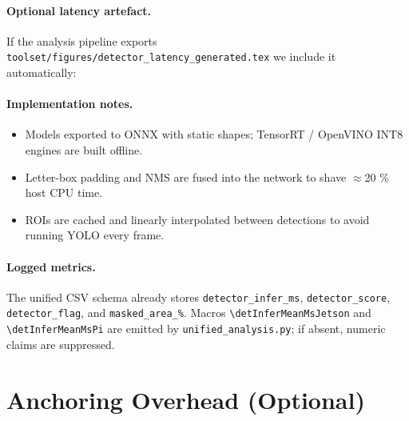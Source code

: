 \paragraph{Optional latency artefact.}
If the analysis pipeline exports \texttt{toolset/figures/detector\_latency\_generated.tex}
we include it automatically:


\providecommand{\detInferMeanMsJetson}{--}
\providecommand{\detInferMeanMsPi}{--}

\paragraph{Implementation notes.}
\begin{itemize}
    \item Models exported to ONNX with static shapes; TensorRT / OpenVINO INT8 engines are built offline.
    \item Letter-box padding and NMS are fused into the network to shave $\approx$20 \% host CPU time.
    \item ROIs are cached and linearly interpolated between detections to avoid running YOLO every frame.
\end{itemize}

\paragraph{Logged metrics.}
The unified CSV schema already stores
\texttt{detector\_infer\_ms}, \texttt{detector\_score}, \texttt{detector\_flag},
and \texttt{masked\_area\_\%}.
Macros \verb+\detInferMeanMsJetson+ and \verb+\detInferMeanMsPi+ are emitted by
\texttt{unified_analysis.py}; if absent, numeric claims are suppressed.


\section{Anchoring Overhead (Optional)}
\label{sec:validation:anchoring}

